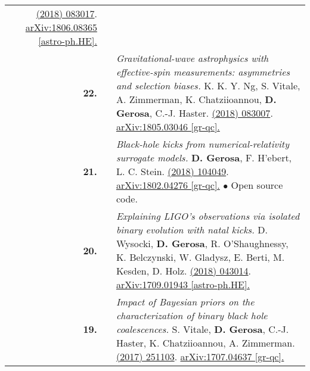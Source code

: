 {\begin{longtable}{rp{0.3cm}p{15.8cm}}
\newline{}
\href{https://journals.aps.org/prd/abstract/10.1103/PhysRevD.98.083017}{\prd 98 (2018) 083017}. \href{https://arxiv.org/abs/1806.08365}{arXiv:1806.08365 [astro-ph.HE].}
\vspace{0.09cm}\\
%
\textbf{22.} & & \textit{Gravitational-wave astrophysics with effective-spin measurements: asymmetries and selection biases.}
\newline{}
K. K. Y. Ng, S. Vitale, A. Zimmerman, K. Chatziioannou, \textbf{D. Gerosa}, C.-J. Haster.
\newline{}
\href{https://journals.aps.org/prd/abstract/10.1103/PhysRevD.98.083007}{\prd 98 (2018) 083007}. \href{https://arxiv.org/abs/1805.03046}{arXiv:1805.03046 [gr-qc].}
\vspace{0.09cm}\\
%
\textbf{21.} & & \textit{Black-hole kicks from numerical-relativity surrogate models.}
\newline{}
\textbf{D. Gerosa}, F. H'ebert, L. C. Stein.
\newline{}
\href{https://journals.aps.org/prd/abstract/10.1103/PhysRevD.97.104049}{\prd 97 (2018) 104049}. \href{https://arxiv.org/abs/1802.04276}{arXiv:1802.04276 [gr-qc].}
\newline{}
\textcolor{color1}{$\bullet$} Open source code.
\vspace{0.09cm}\\
%
\textbf{20.} & & \textit{Explaining LIGO's observations via isolated binary evolution with natal kicks.}
\newline{}
D. Wysocki, \textbf{D. Gerosa}, R. O'Shaughnessy, K. Belczynski, W. Gladysz, E. Berti, M. Kesden, D. Holz.
\newline{}
\href{https://journals.aps.org/prd/abstract/10.1103/PhysRevD.97.043014}{\prd 97 (2018) 043014}. \href{https://arxiv.org/abs/1709.01943}{arXiv:1709.01943 [astro-ph.HE].}
\vspace{0.09cm}\\
%
\textbf{19.} & & \textit{Impact of Bayesian priors on the characterization of binary black hole coalescences.}
\newline{}
S. Vitale, \textbf{D. Gerosa}, C.-J. Haster, K. Chatziioannou, A. Zimmerman.
\newline{}
\href{http://dx.doi.org/10.1103/PhysRevLett.119.251103}{\prl 119 (2017) 251103}. \href{https://arxiv.org/abs/1707.04637}{arXiv:1707.04637 [gr-qc].}
\vspace{0.09cm}\\

\end{longtable}}
